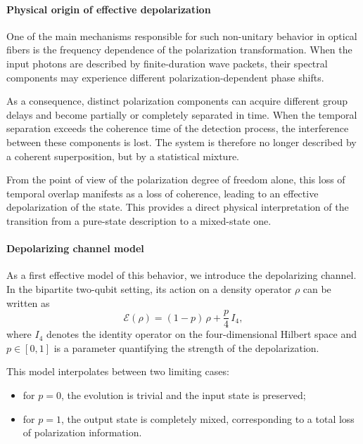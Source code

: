 \documentclass[a4paper]{article}
\begin{document}
\paragraph{Physical origin of effective depolarization}

One of the main mechanisms responsible for such non-unitary behavior in optical fibers is the frequency dependence of the polarization transformation. When the input photons are described by finite-duration wave packets, their spectral components may experience different polarization-dependent phase shifts.

As a consequence, distinct polarization components can acquire different group delays and become partially or completely separated in time. When the temporal separation exceeds the coherence time of the detection process, the interference between these components is lost. The system is therefore no longer described by a coherent superposition, but by a statistical mixture.

\medskip

From the point of view of the polarization degree of freedom alone, this loss of temporal overlap manifests as a loss of coherence, leading to an effective depolarization of the state. This provides a direct physical interpretation of the transition from a pure-state description to a mixed-state one.

\paragraph{Depolarizing channel model}

As a first effective model of this behavior, we introduce the depolarizing channel. In the bipartite two-qubit setting, its action on a density operator \(\rho\) can be written as
\[
\mathcal{E}(\rho)
=
(1 - p)\,\rho
+
\frac{p}{4}\, I_4,
\]
where \(I_4\) denotes the identity operator on the four-dimensional Hilbert space and \(p \in [0,1]\) is a parameter quantifying the strength of the depolarization.

\medskip

This model interpolates between two limiting cases:

\begin{itemize}
    \item for \(p = 0\), the evolution is trivial and the input state is preserved;
    \item for \(p = 1\), the output state is completely mixed, corresponding to a total loss of polarization information.
\end{itemize}
\end{document}
